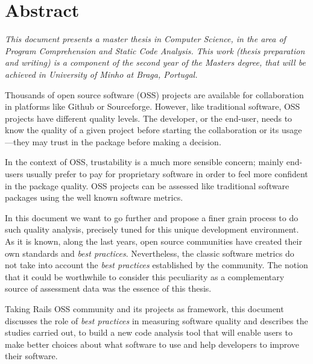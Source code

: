 \thispagestyle{plain}
\chapter*{Abstract}\label{chap:abstract}

{\it
  This document presents a master thesis in Computer Science, in the area of \textit{Program Comprehension and Static Code Analysis}.
  This work (thesis preparation and writing) is a component of the second year of the Masters degree,
  that will be achieved in University of Minho at Braga, Portugal. 

  Thousands of open source software (OSS) projects are available for collaboration in platforms like Github or Sourceforge.
  However, like traditional software, OSS projects have different quality levels.
  The developer, or the end-user, needs to know the quality of a given project before starting the collaboration
  or its usage---they may trust in the package before making a decision.

  In the context of OSS, trustability is a much more sensible concern; mainly end-users usually prefer to pay for
  proprietary software in order to feel more confident in the package quality.
  OSS projects can be assessed like traditional software packages using the well known software metrics.

  In this document we want to go further and propose a finer grain process to do such quality analysis,
  precisely tuned for this unique development environment.
  As it is known, along the last years, open source communities have created their own standards and \emph{best practices}.
  Nevertheless, the classic software metrics do not take into account the \emph{best practices}
  established by the community.
  The notion that it could be worthwhile to consider this peculiarity as a complementary source of assessment data 
  was the essence of this thesis.
  
  Taking Rails OSS community and its projects as framework, this document discusses the role of
  \emph{best practices} in measuring software quality and describes the studies carried out, to build a new code analysis tool that 
  will enable users to make better choices about what software to use and help developers to improve their software.
}
